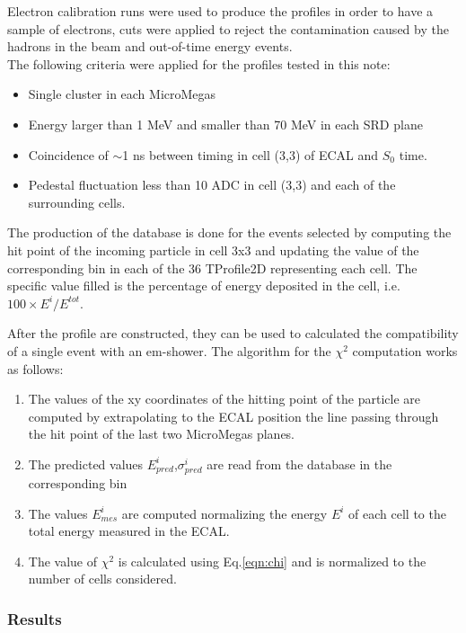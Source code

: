 Electron calibration runs were used to produce the profiles in order to have a sample of electrons, cuts were applied to reject the contamination caused by the hadrons in the beam and out-of-time energy events. \\
The following criteria were applied for the profiles tested in this
note:

\begin{itemize}
\item Single cluster in each MicroMegas
\item Energy larger than 1 MeV and smaller than 70 MeV in each SRD
  plane
\item Coincidence of $\sim$1 ns between timing in cell (3,3) of ECAL
  and $S_0$ time.
\item Pedestal fluctuation less than 10 ADC in cell (3,3) and each of
  the surrounding cells.
\end{itemize}

The production of the database is done for the events
selected by computing the hit point of the incoming particle in cell
3x3 and updating the value of the corresponding bin in each of the 36
TProfile2D representing each cell. The specific value filled is the
percentage of energy deposited in the cell, i.e. $100 \times E^i/E^{tot}$.

After the profile are constructed, they can be used to calculated the compatibility of a single event with an em-shower. The algorithm for the $\chi^2$ computation works as follows:
\begin{enumerate}
\item The values of the xy coordinates of the hitting point of the
  particle are computed by extrapolating to the ECAL position the line
  passing through the hit point of the last two MicroMegas planes.
\item The predicted values $E_{pred}^i$,$\sigma^{i}_{pred}$ are read from the database in the corresponding bin
\item The values $E_{mes}^i$ are computed normalizing the energy $E^i$ of each cell to the total energy measured in the ECAL.
\item The value of $\chi^2$ is calculated using Eq.\ref{eqn:chi} and is normalized to the number of cells considered.
\end{enumerate}

\subsubsection{Results}
\label{ch3:sec:chi2-result}

